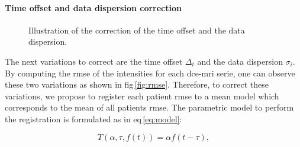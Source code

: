 \paragraph{Time offset and data dispersion correction}\label{par:chp5:DCE-norm:time-off}

\begin{figure}
  \centering
  \hspace*{\fill}
   \hfill
  \hspace*{\fill}
  \caption{Illustration of the correction of the time offset and the data dispersion.}
  \label{fig:curveal}
\end{figure}

The next variations to correct are the time offset $\Delta_t$ and the data dispersion $\sigma_i$.
By computing the \ac{rmse} of the intensities for each \ac{dce}-\ac{mri} serie, one can observe these two variations as shown in \acs{fig}\,\ref{fig:rmse}.
Therefore, to correct these variations, we propose to register each patient \ac{rmse} to a mean model which corresponds to the mean of all patients \ac{rmse}.
The parametric model to perform the registration is formulated as in \acs{eq}\,\eqref{eq:model}:

\begin{equation}
  T(\alpha, \tau, f(t)) = \alpha f(t - \tau) ,
  \label{eq:model}
\end{equation}

